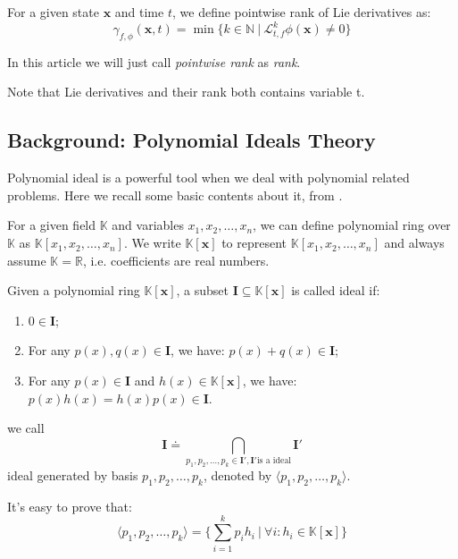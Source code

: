 \documentclass{jssc}
\begin{document}
\begin{definition}
\label{def:lieRank}
For a given state $\boldsymbol{x}$ and time $t$, we define pointwise rank of Lie derivatives as:
\[
	\gamma_{f,\phi}(\boldsymbol{x}, t) = \min\{k \in \mathbb{N}\ |\ \mathcal{L}_{t, f}^k \phi (\boldsymbol{x}) \neq 0\}
\]
\end{definition}

In this article we will just call \emph{pointwise rank} as \emph{rank}.

Note that Lie derivatives and their rank both contains variable t.

\subsection{Background: Polynomial Ideals Theory}
Polynomial ideal is a powerful tool when we deal with polynomial related problems. Here we recall some basic contents about it, from \cite{cox1992ideals}.

For a given field $\mathbb{K}$ and variables $x_1, x_2, \dots, x_n$, we can define polynomial ring over $\mathbb{K}$ as $\mathbb{K}[x_1, x_2, \dots, x_n]$. We write $\mathbb{K}[\boldsymbol{x}]$ to represent $\mathbb{K}[x_1, x_2, \dots, x_n]$ and always assume $\mathbb{K} = \mathbb{R}$, i.e. coefficients are real numbers.

\begin{definition}
Given a polynomial ring $\mathbb{K}[\boldsymbol{x}]$, a subset $\boldsymbol{I} \subseteq \mathbb{K}[\boldsymbol{x}]$ is called ideal if:
	\begin{enumerate}
		\item $0 \in \boldsymbol{I}$;
		\item For any $p(x), q(x) \in \boldsymbol{I}$, we have: $p(x)+q(x) \in \boldsymbol{I}$;
		\item For any $p(x) \in \boldsymbol{I}$ and $h(x) \in \mathbb{K}[\boldsymbol{x}]$, we have: $p(x)h(x) = h(x)p(x) \in \boldsymbol{I}$.
	\end{enumerate}
\end{definition}

\begin{definition}
we call
	\begin{displaymath}
		\boldsymbol{I} \doteq \bigcap_{p_1,p_2,\dots,p_k \in \boldsymbol{I}', \boldsymbol{I}'\text{is a ideal} }\boldsymbol{I}'
	\end{displaymath}
ideal generated by basis $p_1,p_2,\dots, p_k$, denoted by $\langle p_1, p_2, \dots, p_k \rangle$.

It's easy to prove that:
	\begin{displaymath}
		\langle p_1, p_2, \dots, p_k \rangle = \{\sum_{i=1}^k p_ih_i\ |\ \forall i : h_i \in \mathbb{K}[\boldsymbol{x}]\}
	\end{displaymath}
\end{definition}
\end{document}

